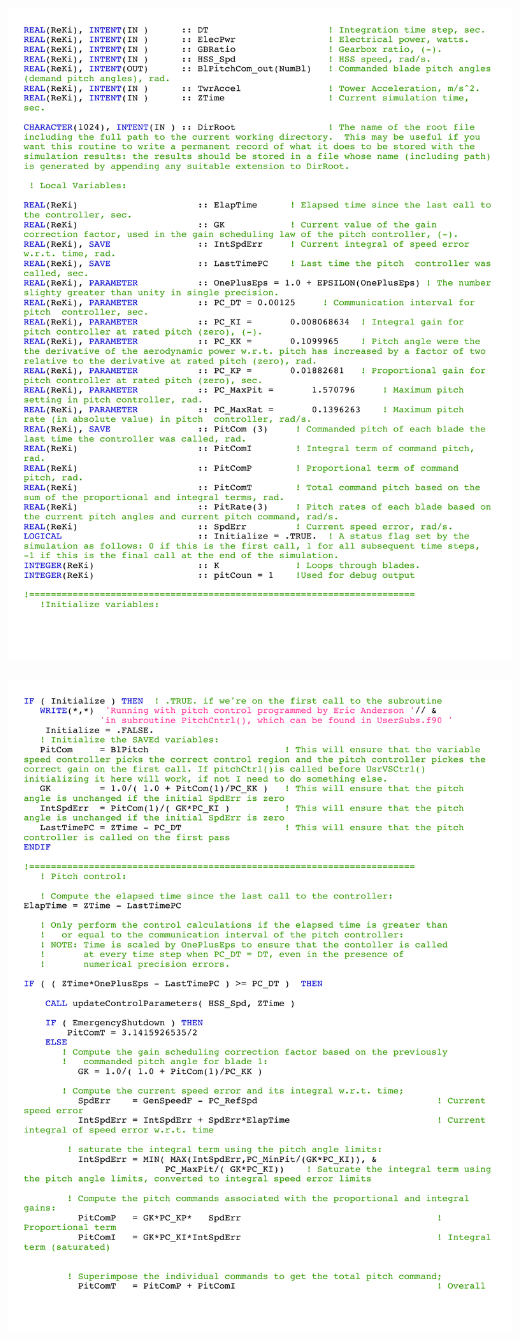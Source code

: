 \noindent
\includegraphics[width=\linewidth]{Figures/AppendixDFigures/figD-1B.pdf}

\noindent
\includegraphics[width=\linewidth]{Figures/AppendixDFigures/figD-1C.pdf}

